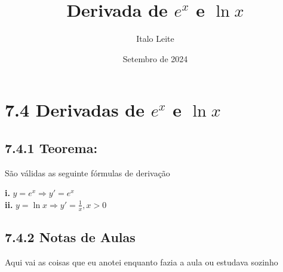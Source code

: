 \documentclass[article,12pt,oneside,a4paper,brazil]{abntex2}
\title{Derivada de $e^x$ e $\ln{x}$}
\author{Italo Leite}
\date{Setembro de 2024}
\begin{document}
	
	
	\section*{7.4 Derivadas de $e^x$ e $\ln x$}
	\subsection*{7.4.1 Teorema: }
	
	\begin{flushleft}	
		São válidas as seguinte fórmulas de derivação
		
		\textbf{i. }  $y = e^x \Rightarrow y' = e^x$ \\ [1em]
		\textbf{ii. } $y = \ln x \Rightarrow y' = \frac{1}{x}, x > 0$ \\ [1em]	
	\end{flushleft}

	\subsection*{7.4.2 Notas de Aulas}

	\begin{flushleft}	
		Aqui vai as coisas que eu anotei enquanto fazia a aula ou estudava sozinho	
	\end{flushleft}
\end{document}
